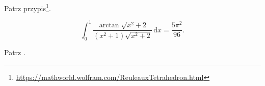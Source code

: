 \begin{solution} %
    Patrz przypis\footnote{\url{https://mathworld.wolfram.com/ReuleauxTetrahedron.html}}. %
\end{solution} %

\begin{problem}
    \label{ahmed_integral}%
    \begin{equation}
        \int_0^1 \frac{\arctan \sqrt{x^2+2}}{(x^2+1) \sqrt{x^2+2}} \,\mathrm{d}x = \frac{5\pi^2}{96}.
    \end{equation}
\end{problem}

\begin{solution} %
    Patrz \cite{ahmed02}. %
\end{solution} %


%